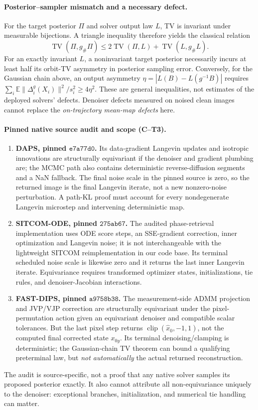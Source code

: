 \paragraph{Posterior--sampler mismatch and a necessary defect.}
For the target posterior $\Pi$ and solver output law $L$,
TV is invariant under measurable bijections. A triangle inequality
therefore yields the classical relation
\[
 \operatorname{TV}(\Pi,g_\#\Pi)
 \le 2\operatorname{TV}(\Pi,L)
       +\operatorname{TV}(L,g_\#L).
\]
For an exactly invariant $L$, a noninvariant target posterior
necessarily incurs at least half its orbit-TV asymmetry in posterior
sampling error. Conversely, for the Gaussian chain above, an output
asymmetry $\eta=|L(B)-L(g^{-1}B)|$ requires
$\sum_i\mathbb E\|\Delta_i^g(X_i)\|^2/s_i^2\ge4\eta^2$.
These are general inequalities, not estimates of the deployed
solvers' defects. Denoiser defects measured on noised clean images
cannot replace the \emph{on-trajectory mean-map defects} here.

\paragraph{Pinned native source audit and scope (C--T3).}
\begin{enumerate}
\item \textbf{DAPS, pinned $\texttt{e7a77d0}$.}
Its data-gradient Langevin updates and isotropic innovations are
structurally equivariant if the denoiser and gradient plumbing are;
the MCMC path also contains deterministic reverse-diffusion segments
and a NaN fallback. The final noise scale in the pinned source is zero,
so the returned image is the final Langevin iterate, not a
new nonzero-noise perturbation. A path-KL proof must account for every
nondegenerate Langevin microstep and intervening deterministic map.
\item \textbf{SITCOM-ODE, pinned $\texttt{275ab67}$.}
The audited phase-retrieval implementation uses ODE score steps,
an SSE-gradient correction, inner optimization and Langevin noise;
it is not interchangeable with the lightweight SITCOM
reimplementation in our code base. Its terminal scheduled
noise scale is likewise zero and it returns the last inner
Langevin iterate. Equivariance requires transformed optimizer states,
initializations, tie rules, and denoiser-Jacobian interactions.
\item \textbf{FAST-DIPS, pinned $\texttt{a9758b38}$.}
The measurement-side ADMM projection and JVP/VJP correction are
structurally equivariant under the pixel-permutation action given
an equivariant denoiser and compatible scalar tolerances. But the
last pixel step returns $\operatorname{clip}(\widehat x_0,-1,1)$,
not the computed final corrected state $x_{0y}$. Its terminal
denoising/clamping is deterministic; the Gaussian-chain TV theorem
can bound a qualifying preterminal law, but \emph{not automatically}
the actual returned reconstruction.
\end{enumerate}
The audit is source-specific, not a proof that any native solver
samples its proposed posterior exactly. It also cannot attribute
all non-equivariance uniquely to the denoiser: exceptional branches,
initialization, and numerical tie handling can matter.

